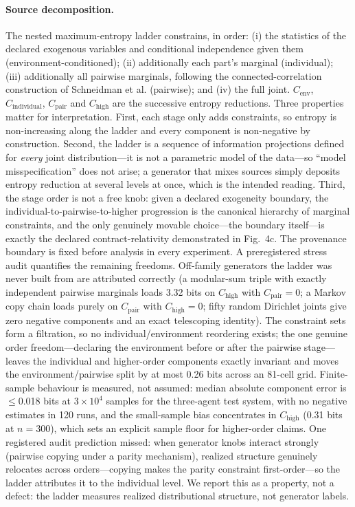 \documentclass[11pt]{article}
\begin{document}
\paragraph{Source decomposition.}
The nested maximum-entropy ladder constrains, in order: (i) the
statistics of the declared exogenous variables and conditional
independence given them (environment-conditioned); (ii) additionally
each part's marginal (individual); (iii) additionally all pairwise
marginals, following the connected-correlation construction of
Schneidman et al.\citep{schneidman2003network} (pairwise); and (iv) the
full joint. $C_\mathrm{env}$, $C_\mathrm{individual}$,
$C_\mathrm{pair}$ and $C_\mathrm{high}$ are the successive entropy
reductions. Three properties matter for interpretation. First, each
stage only adds constraints, so entropy is non-increasing along the
ladder and every component is non-negative by construction. Second,
the ladder is a sequence of information projections defined for
\emph{every} joint distribution---it is not a parametric model of the
data---so ``model misspecification'' does not arise; a generator that
mixes sources simply deposits entropy reduction at several levels at
once, which is the intended reading. Third, the stage order is not a
free knob: given a declared exogeneity boundary, the
individual-to-pairwise-to-higher progression is the canonical hierarchy
of marginal constraints, and the only genuinely movable choice---the
boundary itself---is exactly the declared contract-relativity
demonstrated in Fig.~4c. The provenance boundary is fixed before
analysis in every experiment. A preregistered stress audit quantifies
the remaining freedoms. Off-family generators the ladder was never
built from are attributed correctly (a modular-sum triple with exactly
independent pairwise marginals loads 3.32 bits on $C_\mathrm{high}$
with $C_\mathrm{pair}=0$; a Markov copy chain loads purely on
$C_\mathrm{pair}$ with $C_\mathrm{high}=0$; fifty random Dirichlet
joints give zero negative components and an exact telescoping
identity). The constraint sets form a filtration, so no
individual/environment reordering exists; the one genuine order
freedom---declaring the environment before or after the pairwise
stage---leaves the individual and higher-order components exactly
invariant and moves the environment/pairwise split by at most 0.26
bits across an 81-cell grid. Finite-sample behaviour is measured, not
assumed: median absolute component error is $\leq$0.018 bits at
$3\times10^{4}$ samples for the three-agent test system, with no
negative estimates in 120 runs, and the small-sample bias concentrates
in $C_\mathrm{high}$ (0.31 bits at $n=300$), which sets an explicit
sample floor for higher-order claims. One registered audit prediction
missed: when generator knobs interact strongly (pairwise copying under
a parity mechanism), realized structure genuinely relocates across
orders---copying makes the parity constraint first-order---so the
ladder attributes it to the individual level. We report this as a
property, not a defect: the ladder measures realized distributional
structure, not generator labels.
\end{document}
